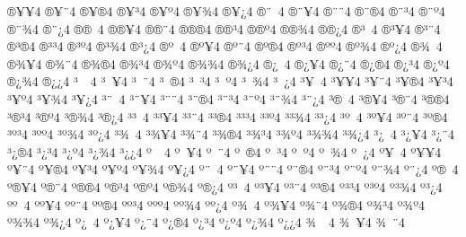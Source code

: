 {^^ae^^a5^^a54
^^ae^^a5^^a84
^^ae^^a5^^ae4
^^ae^^a5^^b34
^^ae^^a5^^ba4
^^ae^^a5^^be4
^^ae^^a5^^bf4
^^ae^^a8^^a04
^^ae^^a8^^a54
^^ae^^a8^^a84
^^ae^^a8^^ae4
^^ae^^a8^^b34
^^ae^^a8^^ba4
^^ae^^a8^^be4
^^ae^^a8^^bf4
^^ae^^ae^^a04
^^ae^^ae^^a54
^^ae^^ae^^a84
^^ae^^ae^^ae4
^^ae^^ae^^b34
^^ae^^ae^^ba4
^^ae^^ae^^be4
^^ae^^ae^^bf4
^^ae^^b3^^a04
^^ae^^b3^^a54
^^ae^^b3^^a84
^^ae^^b3^^ae4
^^ae^^b3^^b34
^^ae^^b3^^ba4
^^ae^^b3^^be4
^^ae^^b3^^bf4
^^ae^^ba^^a04
^^ae^^ba^^a54
^^ae^^ba^^a84
^^ae^^ba^^ae4
^^ae^^ba^^b34
^^ae^^ba^^ba4
^^ae^^ba^^be4
^^ae^^ba^^bf4
^^ae^^be^^a04
^^ae^^be^^a54
^^ae^^be^^a84
^^ae^^be^^ae4
^^ae^^be^^b34
^^ae^^be^^ba4
^^ae^^be^^be4
^^ae^^be^^bf4
^^ae^^bf^^a04
^^ae^^bf^^a54
^^ae^^bf^^a84
^^ae^^bf^^ae4
^^ae^^bf^^b34
^^ae^^bf^^ba4
^^ae^^bf^^be4
^^ae^^bf^^bf4
^^b3^^a0^^a04
^^b3^^a0^^a54
^^b3^^a0^^a84
^^b3^^a0^^ae4
^^b3^^a0^^b34
^^b3^^a0^^ba4
^^b3^^a0^^be4
^^b3^^a0^^bf4
^^b3^^a5^^a04
^^b3^^a5^^a54
^^b3^^a5^^a84
^^b3^^a5^^ae4
^^b3^^a5^^b34
^^b3^^a5^^ba4
^^b3^^a5^^be4
^^b3^^a5^^bf4
^^b3^^a8^^a04
^^b3^^a8^^a54
^^b3^^a8^^a84
^^b3^^a8^^ae4
^^b3^^a8^^b34
^^b3^^a8^^ba4
^^b3^^a8^^be4
^^b3^^a8^^bf4
^^b3^^ae^^a04
^^b3^^ae^^a54
^^b3^^ae^^a84
^^b3^^ae^^ae4
^^b3^^ae^^b34
^^b3^^ae^^ba4
^^b3^^ae^^be4
^^b3^^ae^^bf4
^^b3^^b3^^a04
^^b3^^b3^^a54
^^b3^^b3^^a84
^^b3^^b3^^ae4
^^b3^^b3^^b34
^^b3^^b3^^ba4
^^b3^^b3^^be4
^^b3^^b3^^bf4
^^b3^^ba^^a04
^^b3^^ba^^a54
^^b3^^ba^^a84
^^b3^^ba^^ae4
^^b3^^ba^^b34
^^b3^^ba^^ba4
^^b3^^ba^^be4
^^b3^^ba^^bf4
^^b3^^be^^a04
^^b3^^be^^a54
^^b3^^be^^a84
^^b3^^be^^ae4
^^b3^^be^^b34
^^b3^^be^^ba4
^^b3^^be^^be4
^^b3^^be^^bf4
^^b3^^bf^^a04
^^b3^^bf^^a54
^^b3^^bf^^a84
^^b3^^bf^^ae4
^^b3^^bf^^b34
^^b3^^bf^^ba4
^^b3^^bf^^be4
^^b3^^bf^^bf4
^^ba^^a0^^a04
^^ba^^a0^^a54
^^ba^^a0^^a84
^^ba^^a0^^ae4
^^ba^^a0^^b34
^^ba^^a0^^ba4
^^ba^^a0^^be4
^^ba^^a0^^bf4
^^ba^^a5^^a04
^^ba^^a5^^a54
^^ba^^a5^^a84
^^ba^^a5^^ae4
^^ba^^a5^^b34
^^ba^^a5^^ba4
^^ba^^a5^^be4
^^ba^^a5^^bf4
^^ba^^a8^^a04
^^ba^^a8^^a54
^^ba^^a8^^a84
^^ba^^a8^^ae4
^^ba^^a8^^b34
^^ba^^a8^^ba4
^^ba^^a8^^be4
^^ba^^a8^^bf4
^^ba^^ae^^a04
^^ba^^ae^^a54
^^ba^^ae^^a84
^^ba^^ae^^ae4
^^ba^^ae^^b34
^^ba^^ae^^ba4
^^ba^^ae^^be4
^^ba^^ae^^bf4
^^ba^^b3^^a04
^^ba^^b3^^a54
^^ba^^b3^^a84
^^ba^^b3^^ae4
^^ba^^b3^^b34
^^ba^^b3^^ba4
^^ba^^b3^^be4
^^ba^^b3^^bf4
^^ba^^ba^^a04
^^ba^^ba^^a54
^^ba^^ba^^a84
^^ba^^ba^^ae4
^^ba^^ba^^b34
^^ba^^ba^^ba4
^^ba^^ba^^be4
^^ba^^ba^^bf4
^^ba^^be^^a04
^^ba^^be^^a54
^^ba^^be^^a84
^^ba^^be^^ae4
^^ba^^be^^b34
^^ba^^be^^ba4
^^ba^^be^^be4
^^ba^^be^^bf4
^^ba^^bf^^a04
^^ba^^bf^^a54
^^ba^^bf^^a84
^^ba^^bf^^ae4
^^ba^^bf^^b34
^^ba^^bf^^ba4
^^ba^^bf^^be4
^^ba^^bf^^bf4
^^be^^a0^^a04
^^be^^a0^^a54
^^be^^a0^^a84
}
